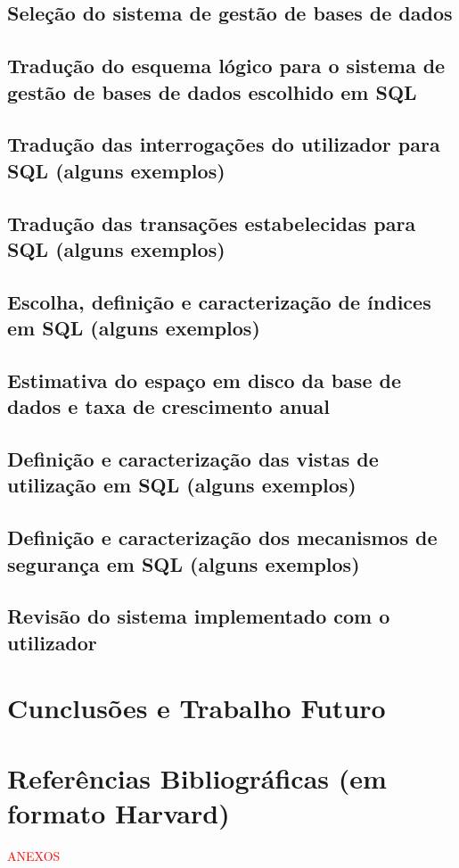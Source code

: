 \documentclass[11pt]{article} %
\begin{document}
\subsection{Seleção do sistema de gestão de bases de dados}

\subsection{Tradução do esquema lógico para o sistema de gestão de bases de dados escolhido em SQL}

\subsection{Tradução das interrogações do utilizador para SQL (alguns exemplos)}

\subsection{Tradução das transações estabelecidas para SQL (alguns exemplos)}

\subsection{Escolha, definição e caracterização de índices em SQL (alguns exemplos)}

\subsection{Estimativa do espaço em disco da base de dados e taxa de crescimento anual}

\subsection{Definição e caracterização das vistas de utilização em SQL (alguns exemplos)}

\subsection{Definição e caracterização dos mecanismos de segurança em SQL (alguns exemplos)}

\subsection{Revisão do sistema implementado com o utilizador}



\section{Cunclusões e Trabalho Futuro}



\section{Referências Bibliográficas (em formato Harvard)}


\textcolor{red}{ANEXOS}
\end{document}
